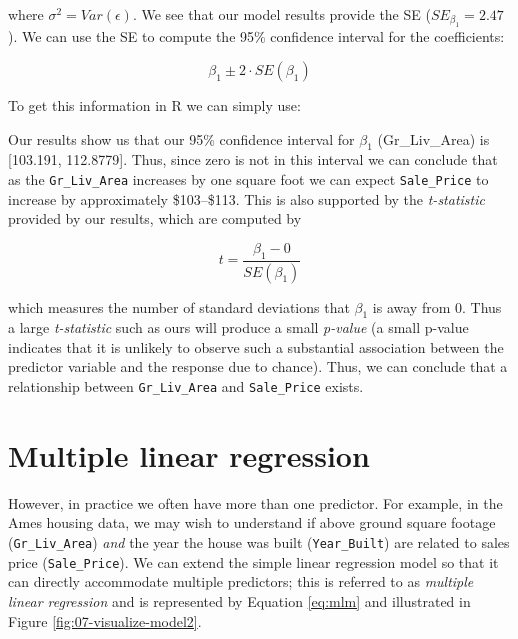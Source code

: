 \documentclass[]{book}
\newenvironment{Shaded}{\begin{snugshade}}{\end{snugshade}}
\newcommand{\KeywordTok}[1]{\textcolor[rgb]{0.13,0.29,0.53}{\textbf{#1}}}
\newcommand{\NormalTok}[1]{#1}
\theoremstyle{definition}
\theoremstyle{definition}
\theoremstyle{definition}
\theoremstyle{remark}
\begin{document}
where \(\sigma^2 = Var(\epsilon)\). We see that our model results
provide the SE (\(SE_{\beta_1}=2.47\)). We can use the SE to compute the
95\% confidence interval for the coefficients:

\begin{equation}
\label{eq:coef-interval}
 \beta_1 \pm 2 \cdot SE(\beta_1)
\end{equation}

To get this information in R we can simply use:

\begin{Shaded}
\end{Shaded}

Our results show us that our 95\% confidence interval for \(\beta_1\)
(Gr\_Liv\_Area) is {[}103.191, 112.8779{]}. Thus, since zero is not in
this interval we can conclude that as the \texttt{Gr\_Liv\_Area}
increases by one square foot we can expect \texttt{Sale\_Price} to
increase by approximately \$103--\$113. This is also supported by the
\emph{t-statistic} provided by our results, which are computed by

\begin{equation}
\label{eq:tstat}
  t=\frac{\beta_1 - 0}{SE(\beta_1)}
\end{equation}

which measures the number of standard deviations that \(\beta_1\) is
away from 0. Thus a large \emph{t-statistic} such as ours will produce a
small \emph{p-value} (a small p-value indicates that it is unlikely to
observe such a substantial association between the predictor variable
and the response due to chance). Thus, we can conclude that a
relationship between \texttt{Gr\_Liv\_Area} and \texttt{Sale\_Price}
exists.

\hypertarget{multi-lm}{%
\section{Multiple linear regression}\label{multi-lm}}

However, in practice we often have more than one predictor. For example,
in the Ames housing data, we may wish to understand if above ground
square footage (\texttt{Gr\_Liv\_Area}) \emph{and} the year the house
was built (\texttt{Year\_Built}) are related to sales price
(\texttt{Sale\_Price}). We can extend the simple linear regression model
so that it can directly accommodate multiple predictors; this is
referred to as \emph{multiple linear regression} and is represented by
Equation \eqref{eq:mlm} and illustrated in Figure
\ref{fig:07-visualize-model2}.
\end{document}
